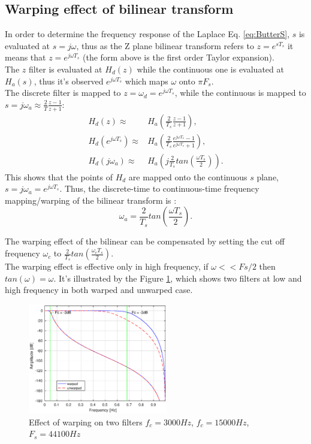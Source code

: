 \documentclass[twoside,twocolumn]{article}
\begin{document}
  \subsection{Warping effect of bilinear transform}
  In order to determine the frequency response of the Laplace Eq. \ref{eq:ButterS}, $s$ is evaluated at $s=j\omega$, thus as the Z plane bilinear transform refers to $z=e^{sT_s}$ it means that $z=e^{j\omega T_s}$ (the form above is the first order Taylor expansion).\\
  The $z$ filter is evaluated at $H_d(z)$ while the continuous one is evaluated at $H_a(s)$, thus it's observed $e^{j\omega T_s}$ which maps $\omega$ onto $\pi F_s$.\\
  The discrete filter is mapped to $z=\omega_d =e^{j\omega T_s}$, while the continuous is mapped to $s=j\omega_a \approx\frac{2}{T}\frac{z-1}{z+1}$:
  \begin{equation}
  \begin{split}
  	H_d(z)\approx & H_a(\frac{2}{T_s}\frac{z-1}{z+1}),\\
  	H_d(e^{j\omega T_s})\approx& H_a(\frac{2}{T_s}\frac{e^{j\omega T_s}-1}{e^{j\omega T_s}+1}),\\
  	H_d(j\omega_a)\approx& H_a(j\frac{2}{T_s}tan(\frac{\omega T_s}{2})).
  	\label{eq:warpe}
  \end{split}
  \end{equation}
    This shows that the points of $H_d$ are mapped onto the continuous $s$ plane, $s=j\omega_a=e^{j\omega T_s}$. Thus, the discrete-time to continuous-time frequency mapping/warping of the bilinear transform is :
   \begin{equation}
	   \omega_a=\frac{2}{T_s}tan(\frac{\omega T_s}{2}).
   \end{equation}
   
   The warping effect of the bilinear can be compensated by setting the cut off frequency $\omega_c$ to $\frac{2}{T_s}tan(\frac{\omega_c T_s}{2})$.\\
   The warping effect is effective only in high frequency, if $\omega<<Fs/2$ then $tan(\omega)=\omega$. It's illustrated by the Figure \ref{warp}, which shows two filters at low and high frequency in both warped and unwarped case.
 \begin{figure}[h!]
 	\centering
 	\includegraphics[width=230px]{./images/warpcomp.eps}
 	\caption{Effect of warping on two filters $f_{c}=3000Hz$, $f_{c}=15000Hz$, $F_s=44100Hz$ }
 	\label{warp}
 \end{figure}
\end{document}

